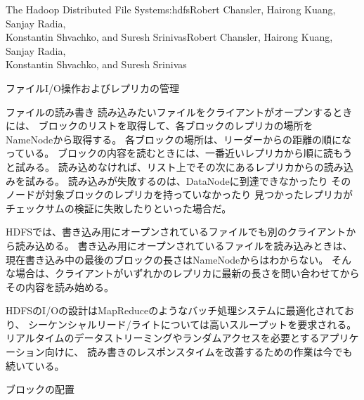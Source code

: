 \begin{aosachaptertoc}{The Hadoop Distributed File System}{s:hdfs}{Robert Chansler, Hairong Kuang, Sanjay Radia, \\ Konstantin Shvachko, and Suresh Srinivas}{Robert Chansler, Hairong Kuang, Sanjay Radia, \\ \hspace*{0.9cm} Konstantin Shvachko, and Suresh Srinivas}
\begin{aosasect1}{ファイルI/O操作およびレプリカの管理}
\begin{aosasect2}{ファイルの読み書き}
読み込みたいファイルをクライアントがオープンするときには、
ブロックのリストを取得して、各ブロックのレプリカの場所をNameNodeから取得する。
各ブロックの場所は、リーダーからの距離の順になっている。
ブロックの内容を読むときには、一番近いレプリカから順に読もうと試みる。
読み込めなければ、リスト上でその次にあるレプリカからの読み込みを試みる。
読み込みが失敗するのは、DataNodeに到達できなかったり
そのノードが対象ブロックのレプリカを持っていなかったり
見つかったレプリカがチェックサムの検証に失敗したりといった場合だ。

HDFSでは、書き込み用にオープンされているファイルでも別のクライアントから読み込める。
書き込み用にオープンされているファイルを読み込みときは、
現在書き込み中の最後のブロックの長さはNameNodeからはわからない。
そんな場合は、クライアントがいずれかのレプリカに最新の長さを問い合わせてから
その内容を読み始める。

HDFSのI/Oの設計はMapReduceのようなバッチ処理システムに最適化されており、
シーケンシャルリード/ライトについては高いスループットを要求される。
リアルタイムのデータストリーミングやランダムアクセスを必要とするアプリケーション向けに、
読み書きのレスポンスタイムを改善するための作業は今でも続いている。

\end{aosasect2}

\begin{aosasect2}{ブロックの配置}


\end{aosasect2}
\end{aosasect1}
\end{aosachaptertoc}
